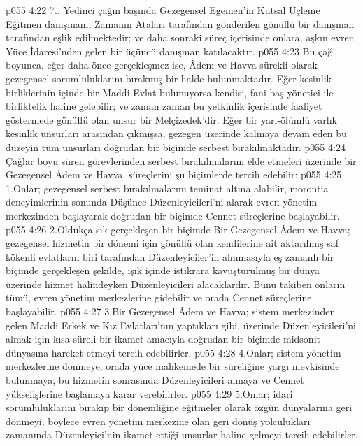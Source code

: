 \vs p055 4:22 7.\bibnobreakspace {}. Yedinci çağın başında Gezegensel Egemen’in Kutsal Üçleme Eğitmen danışmanı, Zamanın Ataları tarafından gönderilen gönüllü bir danışman tarafından eşlik edilmektedir; ve daha sonraki süreç içerisinde onlara, aşkın evren Yüce İdaresi’nden gelen bir üçüncü danışman katılacaktır.
\vs p055 4:23 Bu çağ boyunca, eğer daha önce gerçekleşmez ise, Âdem ve Havva sürekli olarak gezegensel sorumluluklarını bırakmış bir halde bulunmaktadır. Eğer kesinlik birliklerinin içinde bir Maddi Evlat bulunuyorsa kendisi, fani baş yönetici ile birliktelik haline gelebilir; ve zaman zaman bu yetkinlik içerisinde faaliyet göstermede gönüllü olan unsur bir Melçizedek'dir. Eğer bir yarı\hyp{}ölümlü varlık kesinlik unsurları arasından çıkmışsa, gezegen üzerinde kalmaya devam eden bu düzeyin tüm unsurları doğrudan bir biçimde serbest bırakılmaktadır.
\vs p055 4:24 Çağlar boyu süren görevlerinden serbest bırakılmalarını elde etmeleri üzerinde bir Gezegensel Âdem ve Havva, süreçlerini şu biçimlerde tercih edebilir:
\vs p055 4:25 1.\bibnobreakspace Onlar; gezegensel serbest bırakılmalarını teminat altına alabilir, morontia deneyimlerinin sonunda Düşünce Düzenleyicileri’ni alarak evren yönetim merkezinden başlayarak doğrudan bir biçimde Cennet süreçlerine başlayabilir.
\vs p055 4:26 2.\bibnobreakspace Oldukça sık gerçekleşen bir biçimde Bir Gezegensel Âdem ve Havva; gezegensel hizmetin bir dönemi için gönüllü olan kendilerine ait aktarılmış saf kökenli evlatların biri tarafından Düzenleyiciler’in alınmasıyla eş zamanlı bir biçimde gerçekleşen şekilde, ışık içinde istikrara kavuşturulmuş bir dünya üzerinde hizmet halindeyken Düzenleyicileri alacaklardır. Bunu takiben onların tümü, evren yönetim merkezlerine gidebilir ve orada Cennet süreçlerine başlayabilir.
\vs p055 4:27 3.\bibnobreakspace Bir Gezegensel Âdem ve Havva; sistem merkezinden gelen Maddi Erkek ve Kız Evlatları’nın yaptıkları gibi, üzerinde Düzenleyicileri’ni almak için kısa süreli bir ikamet amacıyla doğrudan bir biçimde midsonit dünyasına hareket etmeyi tercih edebilirler.
\vs p055 4:28 4.\bibnobreakspace Onlar; sistem yönetim merkezlerine dönmeye, orada yüce mahkemede bir süreliğine yargı mevkisinde bulunmaya, bu hizmetin sonrasında Düzenleyicileri almaya ve Cennet yükselişlerine başlamaya karar verebilirler.
\vs p055 4:29 5.\bibnobreakspace Onlar; idari sorumluluklarını bırakıp bir dönemliğine eğitmeler olarak özgün dünyalarına geri dönmeyi, böylece evren yönetim merkezine olan geri dönüş yolculukları zamanında Düzenleyici’nin ikamet ettiği unsurlar haline gelmeyi tercih edebilirler.
